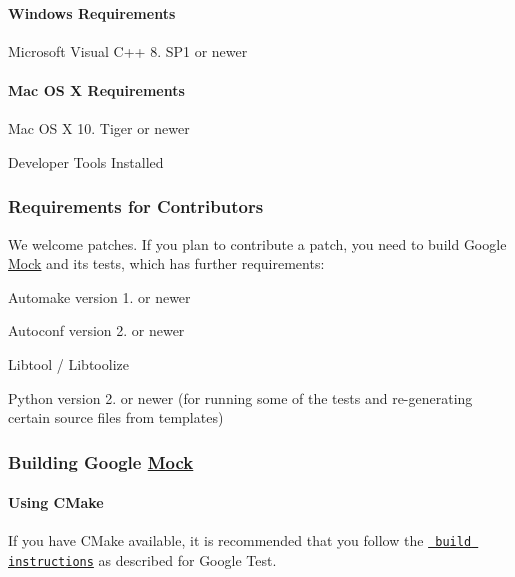 \paragraph*{Windows Requirements}


\begin{DoxyItemize}
\item Microsoft Visual C++ 8. S\+P1 or newer
\end{DoxyItemize}

\paragraph*{Mac OS X Requirements}


\begin{DoxyItemize}
\item Mac OS X 10. Tiger or newer
\item Developer Tools Installed
\end{DoxyItemize}

\subsubsection*{Requirements for Contributors}

We welcome patches. If you plan to contribute a patch, you need to build Google \mbox{\hyperlink{class_mock}{Mock}} and its tests, which has further requirements\+:


\begin{DoxyItemize}
\item Automake version 1. or newer
\item Autoconf version 2. or newer
\item Libtool / Libtoolize
\item Python version 2. or newer (for running some of the tests and re-\/generating certain source files from templates)
\end{DoxyItemize}

\subsubsection*{Building Google \mbox{\hyperlink{class_mock}{Mock}}}

\paragraph*{Using C\+Make}

If you have C\+Make available, it is recommended that you follow the \href{../googletest/README.md\#using-cmake}{\texttt{ build instructions}} as described for Google Test.

